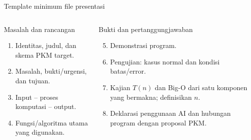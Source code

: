 \documentclass[aspectratio=169,11pt]{beamer}
\begin{document}
\begin{frame}{Template minimum file presentasi}
\small
\begin{columns}[T]
\begin{block}{Masalah dan rancangan}
\begin{enumerate}
  \item Identitas, judul, dan skema PKM target.
  \item Masalah, bukti/urgensi, dan tujuan.
  \item Input -- proses komputasi -- output.
  \item Fungsi/algoritma utama yang digunakan.
\end{enumerate}
\end{block}
\begin{block}{Bukti dan pertanggungjawaban}
\begin{enumerate}
  \setcounter{enumi}{4}
  \item Demonstrasi program.
  \item Pengujian: kasus normal dan kondisi batas/error.
  \item Kajian $T(n)$ dan Big-O dari satu komponen yang bermakna; definisikan $n$.
  \item Deklarasi penggunaan AI dan hubungan program dengan proposal PKM.
\end{enumerate}
\end{block}
\end{columns}
\end{frame}
\end{document}
